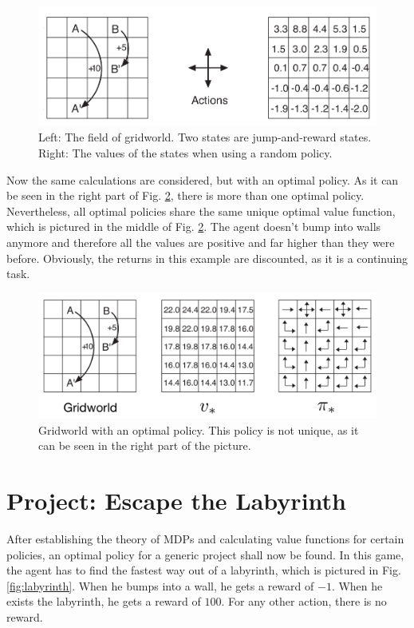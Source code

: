 \documentclass[paper=a4, fontsize=11pt]{scrartcl} %
\numberwithin{equation}{section} %
\numberwithin{figure}{section} %
\numberwithin{table}{section} %
\begin{document}
\begin{figure}[H]
\centering
\includegraphics[width=0.6\linewidth]{Images/gridworldrandom.png}
\caption{\cite{SuttonBarto} Left: The field of gridworld. Two states are jump-and-reward states. Right: The values of the states when using a random policy.}
\label{fig:RandomGridworld}
\end{figure}

	Now the same calculations are considered, but with an optimal policy. As it can be seen in the right part of Fig. \ref{fig:OptimalGridworld}, there is more than one optimal policy. Nevertheless, all optimal policies share the same unique optimal value function, which is pictured in the middle of Fig. \ref{fig:OptimalGridworld}. The agent doesn't bump into walls anymore and therefore all the values are positive and far higher than they were before. Obviously, the returns in this example are discounted, as it is a continuing task.

\begin{figure}[H]
\centering
\includegraphics[width=0.6\linewidth]{Images/gridworldoptimal.png}
\caption{\cite{SuttonBarto} Gridworld with an optimal policy. This policy is not unique, as it can be seen in the right part of the picture.}
\label{fig:OptimalGridworld}
\end{figure}

\section{Project: Escape the Labyrinth}

	After establishing the theory of MDPs and calculating value functions for certain policies, an optimal policy for a generic project shall now be found. In this game, the agent has to find the fastest way out of a labyrinth, which is pictured in Fig. \ref{fig:labyrinth}. When he bumps into a wall, he gets a reward of $-1$. When he exists the labyrinth, he gets a reward of $100$. For any other action, there is no reward.
\end{document}
